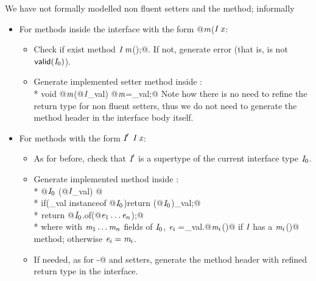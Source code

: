 We have not formally modelled non fluent setters and the \Q@with@ method; informally
\begin{itemize}
\item For methods inside the interface with the form \Q@void @$\textit{m}$\QM($\C\ \x$\QM{);}:
  \begin{itemize}
    \item Check if exist method $\C\ \m$\Q@();@. If not, generate error (that is, is not $\textsf{valid}(\textit{I}_0)$).
    \item Generate implemented setter method inside \Q@of@:\\*
           \Q@public void @$\textit{m}$\Q@(@$\textit{I}$\Q@ _val) { @$\textit{m}$\Q@=_val;}@
    Note how there is no need to refine the return type for non fluent setters, thus we do not need to generate the method header in the interface body itself.
    \end{itemize}
\item For methods with the form $\C'\ $$\C\ \x$\QM{);}:
  \begin{itemize}
    \item As for before, check that $\textit{I}'$ is a supertype of the current interface type $\textit{I}_0$.
    \item Generate implemented \Q@with@ method inside \Q@of@:\\*
           \Q@public @$\textit{I}_0\ $\Q@with(@$\textit{I}$\Q@ _val) { @\\*
           \Q@  if(_val instanceof @$\textit{I}_0$\Q@){return (@$\textit{I}_0$\Q@)_val;}@\\*
${}_{}$\Q@  return @$\textit{I}_0$\Q@.of(@$\textit{e}_1\ldots\textit{e}_n$\Q@);}@\\*
where with $\textit{m}_1\ldots\textit{m}_n$  fields of $\textit{I}_0$,
$\textit{e}_i=$\Q@_val.@$\textit{m}_i$\Q@()@ if $\textit{I}$ has a $\textit{m}_i$\Q@()@ method; otherwise
$\textit{e}_i=\textit{m}_i$.
    \item If needed, as for \Q@with-@ and setters, generate the method header with refined return type in the interface.
 \end{itemize}

\end{itemize}

